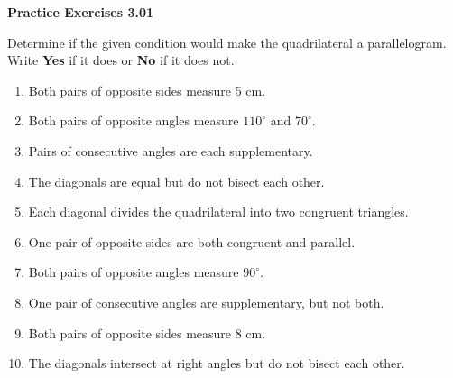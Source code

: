 \vspace{0.3ex}
\noindent\textbf{Practice Exercises 3.01}

\vspace{0.2ex}

\noindent Determine if the given condition would make the quadrilateral a parallelogram. Write \textbf{Yes} if it does or \textbf{No} if it does not.

\begin{enumerate}[label=\color{blue}\arabic*.]
    \item Both pairs of opposite sides measure 5 cm.
    \item Both pairs of opposite angles measure \(110^\circ\) and \(70^\circ\).
    \item Pairs of consecutive angles are each supplementary.
    \item The diagonals are equal but do not bisect each other.
    \item Each diagonal divides the quadrilateral into two congruent triangles.
    \item One pair of opposite sides are both congruent and parallel.
    \item Both pairs of opposite angles measure \(90^\circ\).
    \item One pair of consecutive angles are supplementary, but not both.
    \item Both pairs of opposite sides measure 8 cm.
    \item The diagonals intersect at right angles but do not bisect each other.
\end{enumerate}
